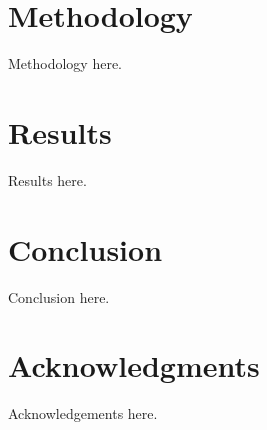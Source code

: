 \documentclass[conference]{IEEEtran}
\begin{document}


\section{Methodology}

Methodology here.

\section{Results}

Results here.

\section{Conclusion}

Conclusion here.

\section*{Acknowledgments}

Acknowledgements here.



\end{document}
